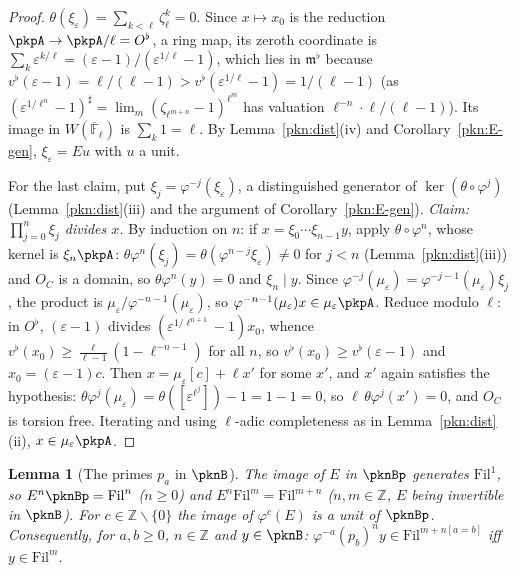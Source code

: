 \documentclass[10pt]{amsart}
\newtheorem{lemma}[theorem]{Lemma}
\theoremstyle{definition}
\theoremstyle{remark}
\newcommand{\Z}{\mathbb Z}
\begin{document}
\begin{proof}
$\theta(\xi_\varepsilon)=\sum_{k<\ell}\zeta_\ell^k=0$. Since $x\mapsto x_0$ is the reduction $\pkpA\to\pkpA/\ell=O^\flat$, a ring map, its zeroth coordinate is
$\sum_k\varepsilon^{k/\ell}=(\varepsilon-1)/(\varepsilon^{1/\ell}-1)$, which lies in $\mathfrak m^\flat$ because
$v^\flat(\varepsilon-1)=\ell/(\ell-1)>v^\flat(\varepsilon^{1/\ell}-1)=1/(\ell-1)$ (as
$(\varepsilon^{1/\ell^n}-1)^\sharp=\lim_m(\zeta_{\ell^{m+n}}-1)^{\ell^m}$ has valuation
$\ell^{-n}\cdot\ell/(\ell-1)$). Its image in $W(\overline{\mathbb F}_\ell)$ is $\sum_k1=\ell$. By
Lemma~\ref{pkn:dist}(iv) and Corollary~\ref{pkn:E-gen}, $\xi_\varepsilon=Eu$ with $u$ a unit.

For the last claim, put $\xi_j=\varphi^{-j}(\xi_\varepsilon)$, a distinguished generator of
$\ker(\theta\circ\varphi^j)$ (Lemma~\ref{pkn:dist}(iii) and the argument of Corollary~\ref{pkn:E-gen}).
\emph{Claim: $\prod_{j=0}^n\xi_j$ divides $x$.} By induction on $n$: if $x=\xi_0\cdots\xi_{n-1}y$, apply
$\theta\circ\varphi^n$, whose kernel is $\xi_n\pkpA$: $\theta\varphi^n(\xi_j)=\theta(\varphi^{n-j}\xi_\varepsilon)
\ne0$ for $j<n$ (Lemma~\ref{pkn:dist}(iii)) and $O_C$ is a domain, so $\theta\varphi^n(y)=0$ and
$\xi_n\mid y$. Since $\varphi^{-j}(\mu_\varepsilon)=\varphi^{-j-1}(\mu_\varepsilon)\xi_j$, the product is
$\mu_\varepsilon/\varphi^{-n-1}(\mu_\varepsilon)$, so $\varphi^{-n-1}(\mu_\varepsilon)x\in\mu_\varepsilon\pkpA$.
Reduce modulo $\ell$: in $O^\flat$, $(\varepsilon-1)$ divides $(\varepsilon^{1/\ell^{n+1}}-1)x_0$, whence
$v^\flat(x_0)\ge\frac{\ell}{\ell-1}(1-\ell^{-n-1})$ for all $n$, so $v^\flat(x_0)\ge v^\flat(\varepsilon-1)$
and $x_0=(\varepsilon-1)c$. Then $x=\mu_\varepsilon[c]+\ell x'$ for some $x'$, and $x'$ again satisfies the
hypothesis: $\theta\varphi^j(\mu_\varepsilon)=\theta([\varepsilon^{\ell^j}])-1=1-1=0$, so $\ell\,\theta\varphi^j(x')=0$, and $O_C$ is torsion free. Iterating and using $\ell$-adic
completeness as in Lemma~\ref{pkn:dist}(ii), $x\in\mu_\varepsilon\pkpA$.
\end{proof}

\begin{lemma}[The primes $p_a$ in $\pknB$]\label{pkn:BdR}
The image of $E$ in $\pknBp$ generates $\mathrm{Fil}^1$, so $E^n\pknBp=\mathrm{Fil}^n$ ($n\ge0$) and
$E^n\mathrm{Fil}^m=\mathrm{Fil}^{m+n}$ ($n,m\in\Z$, $E$ being invertible in $\pknB$). For $c\in\Z\smallsetminus
\{0\}$ the image of $\varphi^c(E)$ is a unit of $\pknBp$. Consequently, for $a,b\ge0$, $n\in\Z$ and
$y\in\pknB$: $\varphi^{-a}(p_b)^n y\in\mathrm{Fil}^{m+n[a=b]}$ iff $y\in\mathrm{Fil}^m$.
\end{lemma}
\end{document}
